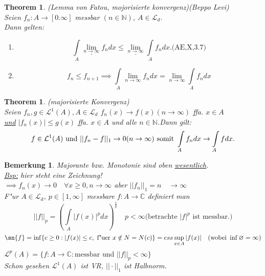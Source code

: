 \documentclass[a4paper,11pt]{book}
\newcommand{\C}{{\mathbb C}}
\newcommand{\N}{{\mathbb N}}
\def\sL{ \mathcal{L}}
\def\folgt{\ensuremath{\implies}}
\newtheorem{Theo}[Def]{Theorem}
\newtheorem*{BemNO}{Bemerkung}
\theoremstyle{nonumberplain}
\begin{document}
\begin{Theo}(Lemma von Fatou, mojorisierte konvergenz)(Beppo Levi)\\
Seien $f_{n}:A\rightarrow [0.\infty]$ messbar $(n\in \N)$, $A\in\sL_{d}$.\\
Dann gelten:
\begin{enumerate}
\item [a)]
\begin{displaymath}
\int\limits_{A} \underline{\lim_{n\rightarrow \infty}} f_{n}dx \leq \underline{\lim_{n\rightarrow \infty}} \int\limits_{A} f_{n} dx. \textrm{(AE,X,3.7)}
\end{displaymath}
\item [b)]
\begin{displaymath}
f_{n} \leq f_{n+1} \folgt \int\limits_{A} \lim_{n\rightarrow \infty}f_{n}dx=\lim_{n\rightarrow \infty} \int\limits_{A} f_{n}dx
\end{displaymath}
\end{enumerate}
\end{Theo}
\begin{Theo}(majorisierte Konvergenz)\\
Seien $f_{n},g \in \sL^{1}(A), A\in \sL_{d}$ $f_{n}(x)\rightarrow f(x) (n\rightarrow \infty)$ ffa. $x\in A$\\
 \underline{und} $ |f_{n}(x)|\leq g(x)$ ffa.
$x\in A$ und alle $n\in \N$.Dann gilt:
\begin{displaymath}
f\in \sL^{1}(A) \textrm{ und } ||f_{n}-f||_{1} \rightarrow 0 (n\rightarrow \infty)\\
\textrm{ somit } \int\limits_{A} f_{n}dx \rightarrow \int\limits_{A} fdx.
\end{displaymath}
\end{Theo}
\begin{BemNO}Majorante bzw. Monotonie sind oben \underline{wesentlich}.\\
\underline{Bsp:} hier steht eine Zeichnung!\\
$\folgt f_{n}(x) \rightarrow 0 \quad\forall x\geq 0, n\rightarrow \infty$ aber 
$||f_{n}||_{1} = n \quad\rightarrow\infty$\\
F"ur $A\in\sL_{d}$, $p\in[1,\infty]$ messbare $f:A\rightarrow \C$ definiert man
\begin{displaymath}
||f||_{p} = (\int\limits_{A}|f(x)|^{p}dx)^{\frac{1}{p}} \quad p<\infty \textrm{(betrachte $|f|^{p}$ ist messbar.)}
\end{displaymath}
\begin{displaymath}
\sn{f}=\inf\{c\geq 0: |f(x)| \leq c,\textrm{ f"uer }x\notin N=N(c)\}= ess \sup_{x\in A} |f(x)| \quad (\textrm{wobei } \inf \varnothing = \infty )
\end{displaymath}
$\sL^{p}(A) = \{f:A\rightarrow \C : \textrm{messbar und }  ||f||_{p} <\infty \}$\\
Schon gesehen $\sL^{1}(A)$ ist VR, $||\cdot||_{1}$ ist Halbnorm.
\end{BemNO}
\end{document}
